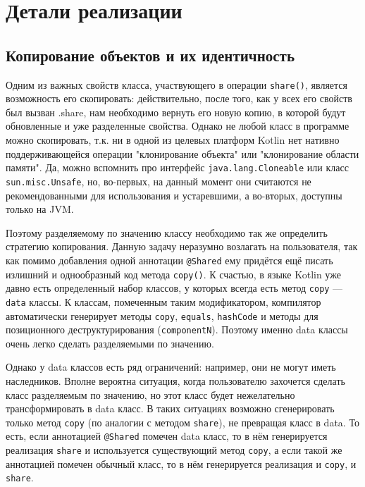 \documentclass[specification,annotation,times]{itmo-student-thesis}
\newcommand{\todo}[1]{\textbf{TODO}} %
\begin{document}
\chapter{Детали реализации}



\section{Копирование объектов и их идентичность}

Одним из важных свойств класса, участвующего в операции \texttt{share()}, является возможность его скопировать: действительно, после того, как у всех его свойств был вызван .share, нам необходимо вернуть его новую копию, в которой будут обновленные и уже разделенные свойства.
Однако не любой класс в программе можно скопировать, т.к. ни в одной из целевых платформ Kotlin нет нативно поддерживающейся операции "клонирование объекта" или "клонирование области памяти". Да, можно вспомнить про интерфейс \texttt{java.lang.Cloneable} или класс \texttt{sun.misc.Unsafe}, но, во-первых, на данный момент они считаются не рекомендованными для использования и устаревшими, а во-вторых, доступны только на JVM.

Поэтому разделяемому по значению классу необходимо так же определить стратегию копирования. Данную задачу неразумно возлагать на пользователя, так как помимо добавления одной аннотации \texttt{@Shared} ему придётся ещё писать излишний и однообразный код метода \texttt{copy()}.
К счастью, в языке Kotlin уже давно есть определенный набор классов, у которых всегда есть метод \texttt{copy} --- \texttt{data} классы. К классам, помеченным таким модификатором, компилятор автоматически генерирует методы \texttt{copy}, \texttt{equals}, \texttt{hashCode} и методы для позиционного деструктурирования (\texttt{componentN}).
Поэтому именно data классы очень легко сделать разделяемыми по значению.

Однако у data классов есть ряд ограничений: например, они не могут иметь наследников. Вполне вероятна ситуация, когда пользователю захочется сделать класс разделяемым по значению, но этот класс будет нежелательно трансформировать в data класс.
В таких ситуациях возможно сгенерировать только метод \texttt{copy} (по аналогии с методом \texttt{share}), не превращая класс в data. То есть, если аннотацией \texttt{@Shared} помечен data класс, то в нём генерируется реализация \texttt{share} и используется существующий метод \texttt{copy}, а если такой же аннотацией помечен обычный класс, то в нём генерируется реализация и \texttt{copy}, и \texttt{share}.
\end{document}
